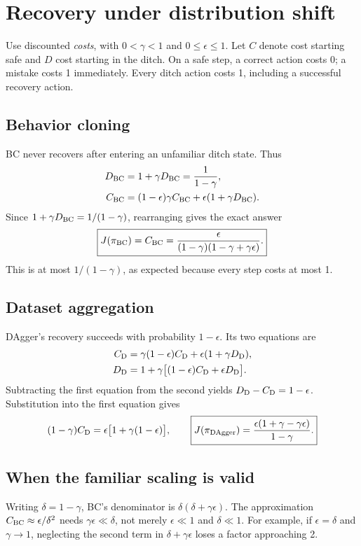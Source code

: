 


\section{Recovery under distribution shift}
Use discounted \emph{costs}, with $0<\gamma<1$ and $0\leq\epsilon\leq1$.
Let $C$ denote cost starting safe and $D$ cost starting in the ditch. On a
safe step, a correct action costs 0; a mistake costs 1 immediately. Every
ditch action costs 1, including a successful recovery action.

\subsection{Behavior cloning}
BC never recovers after entering an unfamiliar ditch state. Thus
\begin{align*}
 D_{\rm BC}&=1+\gamma D_{\rm BC}=\frac{1}{1-\gamma},\\
 C_{\rm BC}&=(1-\epsilon)\gamma C_{\rm BC}
                  +\epsilon(1+\gamma D_{\rm BC}).
\end{align*}
Since $1+\gamma D_{\rm BC}=1/(1-\gamma)$, rearranging gives the exact answer
\[
 \boxed{J(\pi_{\rm BC})=C_{\rm BC}
 =\frac{\epsilon}{(1-\gamma)(1-\gamma+\gamma\epsilon)}.}
\]
This is at most $1/(1-\gamma)$, as expected because every step costs at most 1.

\subsection{Dataset aggregation}
DAgger's recovery succeeds with probability $1-\epsilon$. Its two equations are
\begin{align*}
 C_{\rm D}&=\gamma(1-\epsilon)C_{\rm D}
                        +\epsilon(1+\gamma D_{\rm D}),\\
 D_{\rm D}&=1+\gamma\big[(1-\epsilon)C_{\rm D}+\epsilon D_{\rm D}\big].
\end{align*}
Subtracting the first equation from the second yields $D_{\rm D}-C_{\rm D}=1-\epsilon$.
Substitution into the first equation gives
\[
 (1-\gamma)C_{\rm D}=\epsilon\big[1+\gamma(1-\epsilon)\big],
 \qquad
 \boxed{J(\pi_{\rm DAgger})
 =\frac{\epsilon(1+\gamma-\gamma\epsilon)}{1-\gamma}.}
\]

\subsection{When the familiar scaling is valid}
Writing $\delta=1-\gamma$, BC's denominator is $\delta(\delta+\gamma\epsilon)$.
The approximation $C_{\rm BC}\approx\epsilon/\delta^2$ needs
$\gamma\epsilon\ll\delta$, not merely $\epsilon\ll1$ and $\delta\ll1$.
For example, if $\epsilon=\delta$ and $\gamma\to1$, neglecting the second term
in $\delta+\gamma\epsilon$ loses a factor approaching 2.

